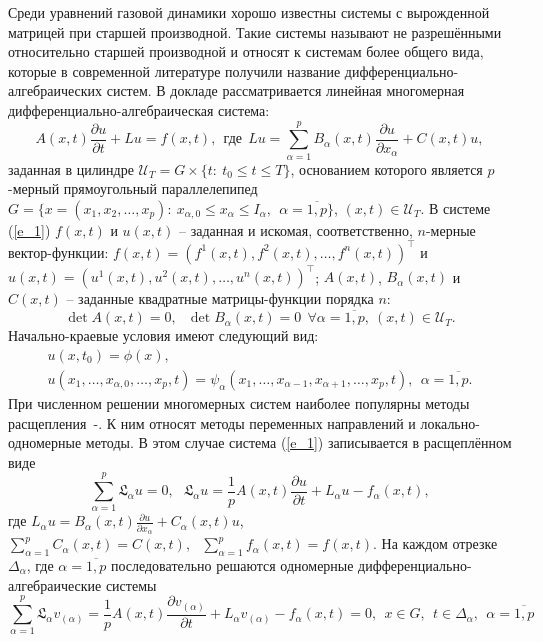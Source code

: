 Среди уравнений газовой динамики хорошо известны системы с вырожденной матрицей при старшей производной. Такие системы называют не разрешёнными относительно старшей производной и относят к системам более общего вида, которые в современной литературе получили название дифференциально-алгебраических систем. 
В докладе рассматривается линейная многомерная дифференциально-алгебраическая система: 
\begin{equation}\label{e_1}
A(x,t) \frac{\partial u}{\partial t}+Lu=f(x,t), \ \ \mbox{где}\ \ Lu=\sum_{\alpha=1}^{p}B_{\alpha}(x,t) \frac{\partial u}{\partial x_{\alpha}} +C(x,t)u,
\end{equation}
заданная в цилиндре $\mathcal{U}_{T}=G\times\{t:\ t_{0}\leq t\leq T\}$, основанием которого является $p$-мерный прямоугольный параллелепипед
$G=\{x=(x_{1},x_{2},\dots,x_{p}):\ x_{\alpha,0}\leq x_{\alpha}\leq I_{\alpha},\ \ \alpha=\overline{1,p}\}$, $(x,t)\in \mathcal{U}_{T}$. 
В системе (\ref{e_1}) $f(x,t)$ и $u(x,t)$ -- заданная и искомая, соответственно, $n$-мерные  вектор-функ\-ции: 
$f(x,t)=(f^{1}(x,t),f^{2}(x,t),\dots,f^{n}(x,t))^{\top}$ и
$u(x,t)=(u^{1}(x,t),u^{2}(x,t),\dots,u^{n}(x,t))^{\top}$;
$A(x,t)$, $B_{\alpha}(x,t)$ и $C(x,t)$ -- заданные квадратные матрицы-функции порядка $n$:
$$
\det A(x,t)=0,\ \ \ \det B_{\alpha}(x,t)=0\ \ \forall \alpha=\overline{1,p},\ (x,t)\in \mathcal{U}_{T}.
$$
Начально-краевые условия имеют следующий вид:
$$
\begin{array}{c}
u(x,t_{0})=\phi(x), \\
u(x_{1},\dots,x_{\alpha,0},\dots,x_{p},t)=\psi_{\alpha}(x_{1},\dots,x_{\alpha-1},x_{\alpha+1},\dots,x_{p},t),
\ \ \alpha=\overline{1,p}.
\end{array}
$$
При численном решении многомерных систем наиболее популярны методы расщепления~\cite{Sam}-\cite{Vab}. К ним относят методы переменных направлений и локально-одномерные методы. 
В этом случае система (\ref{e_1}) записывается в расщеплённом виде
$$
\sum_{\alpha=1}^{p}\mathfrak{L}_{\alpha}u=0,\ \ \ \mathfrak{L}_{\alpha}u=\frac{1}{p}A(x,t)\frac{\partial u}{\partial t}+L_{\alpha}u-f_{\alpha}(x,t), 
$$
где
$L_{\alpha}u=B_{\alpha}(x,t) \frac{\partial u}{\partial x_{\alpha}} +C_{\alpha}(x,t)u$,
$\sum_{\alpha=1}^{p}C_{\alpha}(x,t)=C(x,t),\ \ \ \sum_{\alpha=1}^{p}f_{\alpha}(x,t)=f(x,t)$.
На каждом отрезке $\Delta_{\alpha}$, где $\alpha=\overline{1,p}$ последовательно решаются одномерные диф\-фе\-рен\-ци\-аль\-но-алгебраические системы
\begin{equation}\label{e_2} 
\sum_{\alpha=1}^{p}\mathfrak{L}_{\alpha}v_{(\alpha)}=\frac{1}{p}A(x,t)\frac{\partial v_{(\alpha)}}{\partial t}+L_{\alpha}v_{(\alpha)}-f_{\alpha}(x,t)=0,\ \ x\in G,\ \ t\in \Delta_{\alpha},\ \ \alpha=\overline{1,p}
\end{equation}
